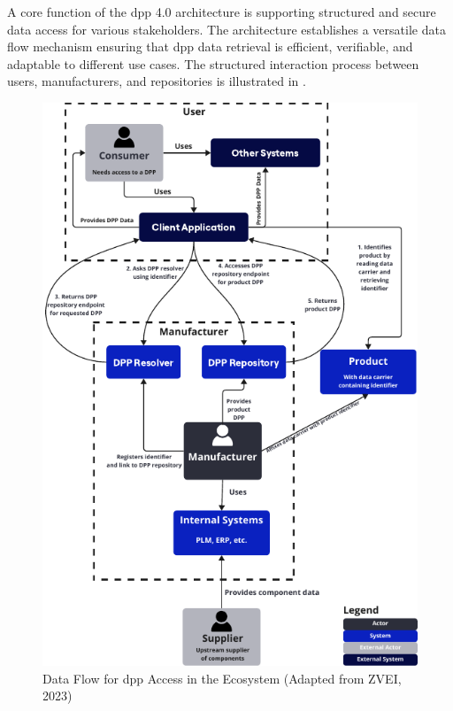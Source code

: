 A core function of the \ac{dpp} 4.0 architecture is supporting structured and secure data access for various stakeholders. The architecture establishes a versatile data flow mechanism ensuring that \ac{dpp} data retrieval is efficient, verifiable, and adaptable to different use cases. The structured interaction process between users, manufacturers, and repositories is illustrated in . \autocite{Garrels.2023}

\begin{figure}[htbp]
    \vspace{-10pt}
    \centering
    \includegraphics[width=\textwidth]{figures/dpp_access_flow.pdf}
    \caption{Data Flow for \ac{dpp} Access in the Ecosystem (Adapted from ZVEI, 2023)}
    \label{fig:dpp_access_flow}
\end{figure}

